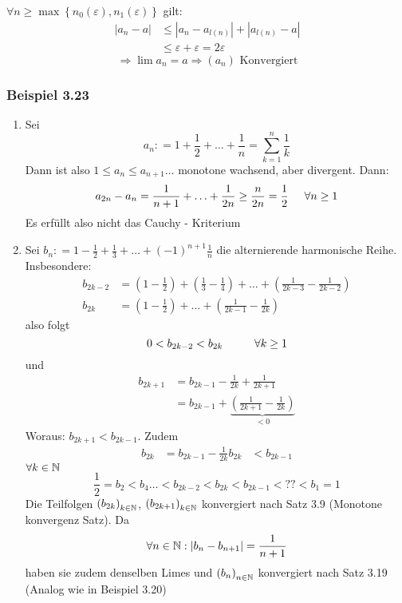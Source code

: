 \begin{beweis}{}
\begin{enumerate}[align=left]
$\forall n \ge \max \left\{ {{n_0}(\varepsilon ),{n_1}(\varepsilon )} \right\}$ gilt:
\begin{align*}
\left| {{a_n} - a} \right| &\le \left| {{a_n} - {a_{l(n)}}} \right| + \left| {{a_{l(n)}} - a} \right|\\
&\le \varepsilon  + \varepsilon  = 2\varepsilon 
\end{align*}
\[ \Rightarrow \lim a_n=a\Rightarrow \left( a_n\right) \text{ Konvergiert}\]
\end{enumerate}
\end{beweis}

\subsubsection*{Beispiel 3.23}
\begin{enumerate}
\item Sei \[{a_n}: = 1 + \frac{1}{2} +  \ldots  + \frac{1}{n} = \sum\limits_{k = 1}^n {\frac{1}{k}} \] Dann ist also $1\leq a_n\leq a_{n+1}\dots$ monotone wachsend, aber divergent. Dann:
\[{a_{2n}} - {a_n} = \frac{1}{{n + 1}} +  \ldots  + \frac{1}{{2n}} \ge \frac{n}{{2n}} = \frac{1}{2}\hspace{5mm}\forall n \ge 1\] 
Es erfüllt also nicht das Cauchy - Kriterium
\item Sei ${b_n}: = 1 - \frac{1}{2} + \frac{1}{3} +  \ldots  + {\left( { - 1} \right)^{n + 1}}\frac{1}{n}$ die alternierende harmonische Reihe. Insbesondere:
\begin{align*}
{b_{2k - 2}}&= \left( {1 - \frac{1}{2}} \right) + \left( {\frac{1}{3} - \frac{1}{4}} \right) +  \ldots  + \left( {\frac{1}{{2k - 3}} - \frac{1}{{2k - 2}}} \right)\\
{b_{2k}}&= \left( {1 - \frac{1}{2}} \right) +  \ldots  + \left( {\frac{1}{{2k - 1}} - \frac{1}{{2k}}} \right)
\end{align*}
also folgt \[ 0 < b_{2k-2} < b_{2k}\hspace{10mm}\forall k\geq 1\]
und 
\begin{align*}
{b_{2k + 1}}&= {b_{2k - 1}} - \frac{1}{{2k}} + \frac{1}{{2k + 1}}\\
&= {b_{2k - 1}} + \underbrace {\left( {\frac{1}{{2k + 1}} - \frac{1}{{2k}}} \right)}_{ < 0}
\end{align*}
Woraus: $b_{2k+1}<b_{2k-1}$. Zudem 
\begin{align*}
b_{2k}&=b_{2k-1}-\frac{1}{2k}
b_{2k}&<b_{2k-1}
\end{align*}
$\forall k\in\mathbb{N}$
\[\frac{1}{2} = {b_2} < {b_4} \ldots  < {b_{2k - 2}} < {b_{2k}} < {b_{2k - 1}} < ?? < {b_1} = 1\]
Die Teilfolgen $\left( b_{2k}\right)_{k\in\mathbb{N}}$, $\left( b_{2k+1}\right)_{k\in\mathbb{N}}$ konvergiert nach Satz 3.9 (Monotone konvergenz Satz). Da 
\[\forall n \in\mathbb{N}:\left| {{b_n} - {b_{n + 1}}} \right| = \frac{1}{{n + 1}}\]
haben sie zudem denselben Limes und $\left( b_n\right)_{n\in\mathbb{N}}$ konvergiert nach Satz 3.19 (Analog wie in Beispiel 3.20)
\end{enumerate}

